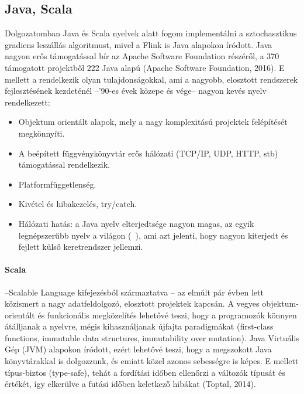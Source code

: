 \documentclass[a4paper,12pt]{article}
\begin{document}
\subsection{Java, Scala}
Dolgozatomban Java és Scala nyelvek alatt fogom implementálni a sztochasztikus gradiens leszállás algoritmust, mivel a Flink is Java alapokon íródott. Java nagyon erős támogatással bír az Apache Software Foundation részéről, a 370 támogatott projektből 222 Java alapú (Apache Software Foundation, 2016). E mellett a rendelkezik olyan tulajdonságokkal, ami a nagyobb, elosztott rendszerek fejlesztésének kezdeténél --'90-es évek közepe és vége-- nagyon kevés nyelv rendelkezett:
\begin{itemize}
\item Objektum orientált alapok, mely a nagy komplexitású projektek felépítését megkönnyíti.
\item A beépített függvénykönyvtár erős hálózati (TCP/IP, UDP, HTTP, stb) támogatással rendelkezik.
\item Platformfüggetlenség.
\item Kivétel és hibakezelés, try/catch.
\item Hálózati hatás: a Java nyelv elterjedtsége nagyon magas, az egyik legnépszerűbb nyelv a világon (~\cite{tiobe}), ami azt jelenti, hogy nagyon kiterjedt és fejlett külső keretrendszer jellemzi.
\end{itemize}

\paragraph{Scala}\hspace*{-0.3cm}--Scalable Language kifejezésből származtatva \cite{odersky}-- az elmúlt pár évben lett közismert a nagy adatfeldolgozó, elosztott projektek kapcsán. A vegyes objektum-orientált és funkcionális megközelítés lehetővé teszi, hogy a programozók könnyen átálljanak a nyelvre, mégis kihasználjanak újfajta paradigmákat (first-class functions, immutable data structures, immutability over mutation). Java Virtuális Gép (JVM) alapokon íródott, ezért lehetővé teszi, hogy a megszokott Java könyvtárakkal is dolgozzunk, és emiatt közel azonos sebességre is képes.  E mellett típus-biztos (type-safe), tehát a fordítási időben ellenőrzi a változók típusát és értékét, így elkerülve a futási időben keletkező hibákat (Toptal, 2014). 
\end{document}
